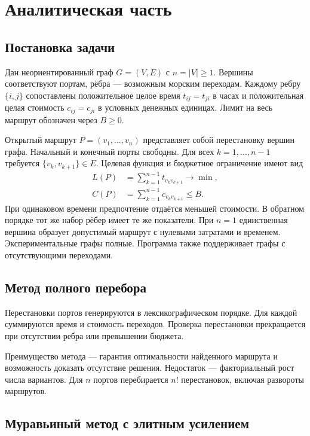 \clearpage
\section{Аналитическая часть}

\subsection{Постановка задачи}

Дан неориентированный граф $G=(V,E)$ с $n=|V|\geq1$. Вершины соответствуют портам, рёбра --- возможным морским переходам. Каждому ребру $\{i,j\}$ сопоставлены положительное целое время $t_{ij}=t_{ji}$ в часах и положительная целая стоимость $c_{ij}=c_{ji}$ в условных денежных единицах. Лимит на весь маршрут обозначен через $B\geq0$.

Открытый маршрут $P=(v_1,\ldots,v_n)$ представляет собой перестановку вершин графа. Начальный и конечный порты свободны. Для всех $k=1,\ldots,n-1$ требуется $\{v_k,v_{k+1}\}\in E$. Целевая функция и бюджетное ограничение имеют вид
\begin{equation}
\begin{aligned}
L(P)&=\sum_{k=1}^{n-1}t_{v_kv_{k+1}}\longrightarrow\min,\\
C(P)&=\sum_{k=1}^{n-1}c_{v_kv_{k+1}}\leq B.
\end{aligned}
\label{eq:objective}
\end{equation}
При одинаковом времени предпочтение отдаётся меньшей стоимости. В обратном порядке тот же набор рёбер имеет те же показатели. При $n=1$ единственная вершина образует допустимый маршрут с нулевыми затратами и временем. Экспериментальные графы полные. Программа также поддерживает графы с отсутствующими переходами.

\subsection{Метод полного перебора}

Перестановки портов генерируются в лексикографическом порядке. Для каждой суммируются время и стоимость переходов. Проверка перестановки прекращается при отсутствии ребра или превышении бюджета.

Преимущество метода --- гарантия оптимальности найденного маршрута и возможность доказать отсутствие решения. Недостаток --- факториальный рост числа вариантов. Для $n$ портов перебирается $n!$ перестановок, включая развороты маршрутов.

\clearpage
\subsection{Муравьиный метод с элитным усилением}

